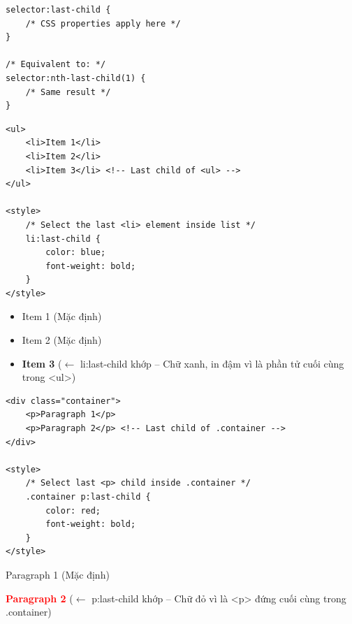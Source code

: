 \begin{codeWindow}
\begin{lstlisting}[language=CSS3]
selector:last-child {
    /* CSS properties apply here */
}

/* Equivalent to: */
selector:nth-last-child(1) {
    /* Same result */
}
\end{lstlisting}
\end{codeWindow}

\begin{codeWindow}
\begin{lstlisting}[language=HTML5]
<ul>
    <li>Item 1</li>
    <li>Item 2</li>
    <li>Item 3</li> <!-- Last child of <ul> -->
</ul>

<style>
    /* Select the last <li> element inside list */
    li:last-child {
        color: blue;
        font-weight: bold;
    }
</style>
\end{lstlisting}
\end{codeWindow}

\begin{browserWindow}
\sffamily\small
\begin{itemize}[leftmargin=1.5em, itemsep=2pt, parsep=0pt]
    \item Item 1 {\scriptsize\textcolor{gray!60}{(Mặc định)}}
    \item Item 2 {\scriptsize\textcolor{gray!60}{(Mặc định)}}
    \item \textcolor{primaryBlue}{\textbf{Item 3}} {\scriptsize\textcolor{gray!60}{($\leftarrow$ li:last-child khớp -- Chữ xanh, in đậm vì là phần tử cuối cùng trong <ul>)}}
\end{itemize}
\end{browserWindow}

\begin{codeWindow}
\begin{lstlisting}[language=HTML5]
<div class="container">
    <p>Paragraph 1</p>
    <p>Paragraph 2</p> <!-- Last child of .container -->
</div>

<style>
    /* Select last <p> child inside .container */
    .container p:last-child {
        color: red;
        font-weight: bold;
    }
</style>
\end{lstlisting}
\end{codeWindow}

\begin{browserWindow}
\sffamily\small
Paragraph 1 {\scriptsize\textcolor{gray!60}{(Mặc định)}} \par\vspace{2pt}
\textcolor{red}{\textbf{Paragraph 2}} {\scriptsize\textcolor{gray!60}{($\leftarrow$ p:last-child khớp -- Chữ đỏ vì là <p> đứng cuối cùng trong .container)}}
\end{browserWindow}

